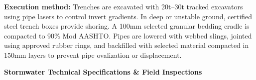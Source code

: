 \noindent
\begin{minipage}[t]{0.185\textwidth}\end{minipage}\hfill
\begin{minipage}[t]{0.185\textwidth}\end{minipage}\hfill
\begin{minipage}[t]{0.185\textwidth}\end{minipage}\hfill
\begin{minipage}[t]{0.185\textwidth}\end{minipage}\hfill
\begin{minipage}[t]{0.185\textwidth}\end{minipage}

\vspace{0.20cm}

\noindent
\begin{tcolorbox}[enhanced, colback=mhoffwhite, colframe=mhlightgray, boxrule=0.7pt, arc=4pt, left=9pt, right=9pt, top=7pt, bottom=7pt, borderline west={3pt}{0pt}{mhgold}, drop shadow=black!4]
    {\fontsize{8.1pt}{11.0pt}\selectfont\color{mhtext}
    \textbf{Execution method:} Trenches are excavated with 20t--30t tracked excavators using pipe lasers to control invert gradients. In deep or unstable ground, certified steel trench boxes provide shoring. A 100mm selected granular bedding cradle is compacted to 90\% Mod AASHTO. Pipes are lowered with webbed slings, jointed using approved rubber rings, and backfilled with selected material compacted in 150mm layers to prevent pipe ovalization or displacement.
    }
\end{tcolorbox}

\vfill

\noindent
{\large\bfseries\color{mhnavy} Stormwater Technical Specifications \& Field Inspections}
\vspace{0.10cm}

